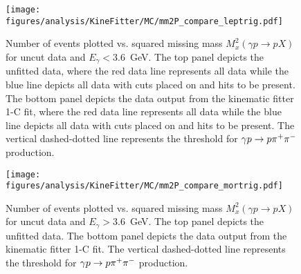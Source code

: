 \begin{figure}[h!]\begin{center}
\texttt{[image: \\figures/analysis/KineFitter/MC/mm2P\_compare\_leptrig.pdf]}
\caption[Number of  events plotted vs. missing mass $M_x(\gamma p \to p X)$ for uncut data and $E_\gamma < 3.6$~GeV]{\label{fig:kinfit.effect_lepMC}Number of  events plotted vs. squared missing mass $M^{2}_x(\gamma p \to p X)$ for uncut data and $E_\gamma < 3.6$~GeV. The top panel depicts the unfitted data, where the red data line represents all data while the blue line depicts all data with cuts placed on  and  hits to be present. The bottom panel depicts the data output from the kinematic fitter 1-C fit, where the red data line represents all data while the blue line depicts all data with cuts placed on  and  hits to be present. The vertical dashed-dotted line represents the threshold for $\gamma p \to p \pi^+\pi^-$ production. }
\end{center}\end{figure}

\begin{figure}[h!]\begin{center}
\texttt{[image: \\figures/analysis/KineFitter/MC/mm2P\_compare\_mortrig.pdf]}
\caption[Number of  events plotted vs. missing mass $M^{2}_x(\gamma p \to p X)$ for uncut data and $E_\gamma > 3.6$~GeV]{\label{fig:kinfit.effect_morMC}Number of  events plotted vs. squared missing mass $M^{2}_x(\gamma p \to p X)$ for uncut data and $E_\gamma > 3.6$~GeV. The top panel depicts the unfitted data. The bottom panel depicts the data output from the kinematic fitter 1-C fit. The vertical dashed-dotted line represents the threshold for $\gamma p \to p \pi^+\pi^-$ production.}
\end{center}\end{figure}
\FloatBarrier

